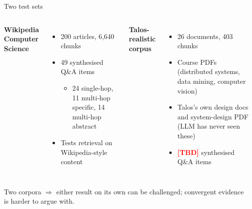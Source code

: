 \documentclass[10pt,aspectratio=169,xcolor={table}]{beamer}
\newcommand{\TalosNQ}{TBD}
\newcommand{\TalosTBD}[1]{\textbf{\textcolor{red}{[#1]}}}
\begin{document}
\begin{frame}{Two test sets}
  \begin{columns}[T,onlytextwidth]
    \textbf{Wikipedia Computer Science}
    \begin{itemize}\small
      \item 200 articles, 6{,}640 chunks
      \item 49 synthesised Q\&A items
        \begin{itemize}\scriptsize
          \item 24 single-hop, 11 multi-hop specific, 14 multi-hop abstract
        \end{itemize}
      \item Tests retrieval on Wikipedia-style content
    \end{itemize}

    \textbf{Talos-realistic corpus}
    \begin{itemize}\small
      \item 26 documents, 403 chunks
      \item Course PDFs (distributed systems, data mining, computer vision)
      \item Talos's own design docs and system-design PDF (LLM has never seen these)
      \item \TalosTBD{\TalosNQ} synthesised Q\&A items
    \end{itemize}
  \end{columns}

  \vspace{14pt}
  \begin{center}\small
    Two corpora $\Rightarrow$ either result on its own can be challenged;
    convergent evidence is harder to argue with.
  \end{center}
\end{frame}
\end{document}
